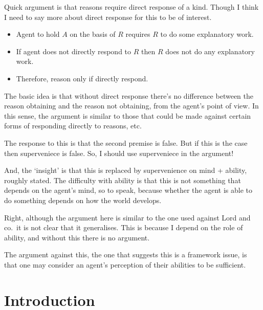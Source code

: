 \documentclass[10pt]{article}
\begin{document}
\begin{note}
  Quick argument is that reasons require direct response of a kind.
  Though I think I need to say more about direct response for this to be of interest.
  \begin{itemize}
  \item Agent to hold \(A\) on the basis of \(R\) requires \(R\) to do some explanatory work.
  \item If agent does not directly respond to \(R\) then \(R\) does not do any explanatory work.
  \item Therefore, reason only if directly respond.
  \end{itemize}
  The basic idea is that without direct response there's no difference between the reason obtaining and the reason not obtaining, from the agent's point of view.
  In this sense, the argument is similar to those that could be made against certain forms of responding directly to reasons, etc.

  The response to this is that the second premise is false.
  But if this is the case then superveniece is false.
  So, I should use superveniece in the argument!

  And, the `insight' is that this is replaced by supervenience on mind + ability, roughly stated.
  The difficulty with ability is that this is not something that depends on the agent's mind, so to speak, because whether the agent is able to do something depends on how the world develops.

  Right, although the argument here is similar to the one used against Lord and co.\ it is not clear that it generalises.
  This is because I depend on the role of ability, and without this there is no argument.

  The argument against this, the one that suggests this is a framework issue, is that one may consider an agent's perception of their abilities to be sufficient.
\end{note}






\newpage

\maketitle

\section{Introduction}
\label{sec:introduction-1}
\end{document}
